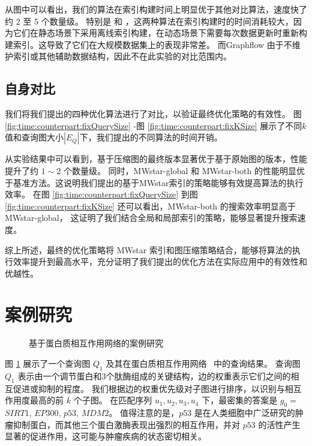 从图中可以看出，我们的算法在索引构建时间上明显优于其他对比算法，速度快了约 2 至 5 个数量级。
特别是 \itk 和 \pm，这两种算法在索引构建时的时间消耗较大，因为它们在静态场景下采用离线索引构建，在动态场景下需要每次数据更新时重新构建索引。这导致了它们在大规模数据集上的表现非常差。
而Graphflow 由于不维护索引或其他辅助数据结构，因此不在此实验的对比范围内。

\subsection{自身对比}
\label{ch5:couterparts}




\label{sec:couterparts}
我们将我们提出的四种优化算法进行了对比，以验证最终优化策略的有效性。
图 \ref{fig:time:counterpart:fixQuerySize} -图 \ref{fig:time:counterpart:fixKSize} 展示了不同$k$值和查询图大小$|E_Q|$下，我们提出的不同算法的时间开销。

从实验结果中可以看到，基于压缩图的最终版本显著优于基于原始图的版本，性能提升了约 $1{\sim}2$ 个数量级。
同时，MWstar-global 和 MWstar-both 的性能明显优于基准方法。这说明我们提出的基于MWstar索引的策略能够有效提高算法的执行效率。
在图 \ref{fig:time:counterpart:fixQuerySize} 到图 \ref{fig:time:counterpart:fixKSize} 还可以看出，MWstar-both 的搜索效率明显高于 MWstar-global，
这证明了我们结合全局和局部索引的策略，能够显著提升搜索速度。

综上所述，最终的优化策略将 MWstar 索引和图压缩策略结合，能够将算法的执行效率提升到最高水平，充分证明了我们提出的优化方法在实际应用中的有效性和优越性。

\section{案例研究}
\begin{figure}[h!]
    \centering
    \caption{基于蛋白质相互作用网络的案例研究}
    \label{fig:human-caseStudy}
    \end{figure}    
图 \ref{fig:human-caseStudy} 展示了一个查询图 $Q_1$ 及其在蛋白质相互作用网络~\cite{dat-protein} 中的查询结果。
    查询图$Q_1$ 表示由一个调节蛋白和3个肽酶组成的关键结构，边的权重表示它们之间的相互促进或抑制的程度。
    我们根据边的权重优先级对子图进行排序，以识别与相互作用度最高的前 $k$ 个子图。
    在匹配序列 ${u_1, u_2, u_3, u_4}$ 下，最密集的答案是 $g_0=${$SIRT1$, $EP300$, $p53$, $MDM2$}。
    值得注意的是，$p53$ 是在人类细胞中广泛研究的肿瘤抑制蛋白，而其他三个蛋白激酶表现出强烈的相互作用，并对 $p53$ 的活性产生显著的促进作用，这可能与肿瘤疾病的状态密切相关。
